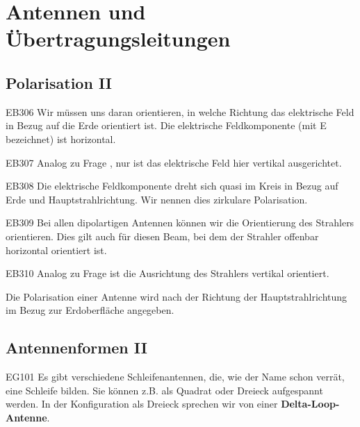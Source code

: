 \setcounter{section}{13}
\section{Antennen und Übertragungsleitungen}
\subsection{Polarisation II}


\begin{sol}{EB306}
Wir müssen uns daran orientieren, in welche Richtung das elektrische Feld in Bezug auf die Erde orientiert ist.
Die elektrische Feldkomponente (mit E bezeichnet) ist horizontal.
\end{sol}

\begin{sol}{EB307}
Analog zu Frage , nur ist das elektrische Feld hier vertikal ausgerichtet.
\end{sol}

\begin{sol}{EB308}
Die elektrische Feldkomponente dreht sich quasi im Kreis in Bezug auf Erde und Hauptstrahlrichtung. Wir nennen dies zirkulare Polarisation.
\end{sol}

\begin{sol}{EB309}
Bei allen dipolartigen Antennen können wir die Orientierung des Strahlers orientieren.
Dies gilt auch für diesen Beam, bei dem der Strahler offenbar horizontal orientiert ist.
\end{sol}


\begin{sol}{EB310}
Analog zu Frage  ist die Ausrichtung des Strahlers vertikal orientiert.
\end{sol}


\begin{ohmchapter}
    Die Polarisation einer Antenne wird nach der Richtung der Hauptstrahlrichtung im Bezug zur Erdoberfläche angegeben.
\end{ohmchapter}



\subsection{Antennenformen II}

\begin{sol}{EG101}
  Es gibt verschiedene Schleifenantennen, die, wie der Name schon verrät, eine Schleife bilden. Sie können z.B. als Quadrat oder Dreieck aufgespannt werden. In der Konfiguration als Dreieck sprechen wir von einer \textbf{Delta-Loop-Antenne}.
\end{sol}


